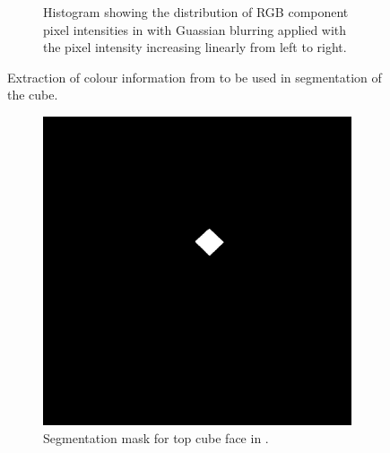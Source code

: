 \begin{figure}[H]
\begin{subfigure}[b]{0.4\textwidth}
        \caption{Histogram showing the distribution of RGB component pixel intensities in  with Guassian blurring applied with the pixel intensity increasing linearly from left to right.}
        \label{fig:blue-cube-close-hist-blur}
    \end{subfigure}
    \captionsetup{singlelinecheck = false, justification=justified}
    \caption{Extraction of colour information from  to be used in segmentation of the cube.}
    \label{fig:blue-cube-color-info}
\end{figure}

\begin{figure}[H]
    \centering
    \begin{subfigure}[b]{0.4\textwidth}
        \includegraphics[width=\textwidth]{figures/202105/blue-cube-top-mask.jpg}
        \caption{Segmentation mask for top cube face in .}
        \label{fig:blue-cube-top-mask}
    \end{subfigure}
    \begin{subfigure}[b]{0.4\textwidth}

\end{subfigure}
\end{figure}
